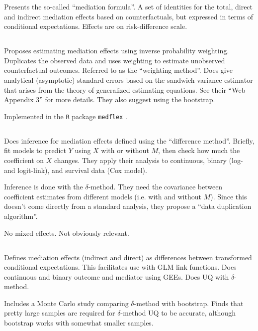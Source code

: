 \documentclass{article}
\begin{document}
Presents the so-called ``mediation formula''. A set of identities for the total, direct and indirect mediation effects based on counterfactuals, but expressed in terms of conditional expectations. Effects are on risk-difference scale.

\subsection{\citet{Lan12}}

Proposes estimating mediation effects using inverse probability weighting. Duplicates the observed data and uses weighting to estimate unobserved counterfactual outcomes. Referred to as the ``weighting method''. Does give analytical (asymptotic) standard errors based on the sandwich variance estimator that arises from the theory of generalized estimating equations. See their ``Web Appendix 3'' for more details. They also suggest using the bootstrap. 

Implemented in the \texttt{R} package \texttt{medflex} \citep{Ste17}.

\subsection{\citet{Nev17}}

Does inference for mediation effects defined using the ``difference method''. Briefly, fit models to predict $Y$ using $X$ with or without $M$, then check how much the coefficient on $X$ changes. They apply their analysis to continuous, binary (log- and logit-link), and survival data (Cox model).

Inference is done with the $\delta$-method. They need the covariance between coefficient estimates from different models (i.e. with and without $M$). Since this doesn't come directly from a standard analysis, they propose a ``data duplication algorithm''.

No mixed effects. Not obviously relevant.


\subsection{\citet{Che21}}

Defines mediation effects (indirect and direct) as differences between transformed conditional expectations. This facilitates use with GLM link functions. Does continuous and binary outcome and mediator using GEEs. Does UQ with $\delta$-method. 

Includes a Monte Carlo study comparing $\delta$-method with bootstrap. Finds that pretty large samples are required for $\delta$-method UQ to be accurate, although bootstrap works with somewhat smaller samples.
\end{document}
